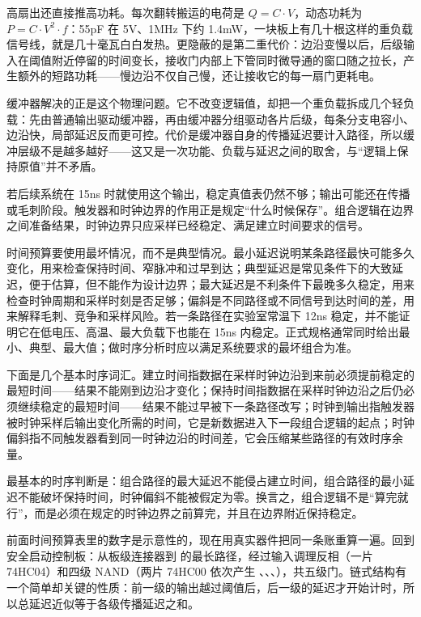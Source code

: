 高扇出还直接推高功耗。每次翻转搬运的电荷是 $Q=C\cdot V$，动态功耗为 $P=C\cdot V^{2}\cdot f$：55pF 在 5V、1MHz 下约 1.4mW，一块板上有几十根这样的重负载信号线，就是几十毫瓦白白发热。更隐蔽的是第二重代价：边沿变慢以后，后级输入在阈值附近停留的时间变长，接收门内部上下管同时微导通的窗口随之拉长，产生额外的短路功耗——慢边沿不仅自己慢，还让接收它的每一扇门更耗电。

缓冲器解决的正是这个物理问题。它不改变逻辑值，却把一个重负载拆成几个轻负载：先由普通输出驱动缓冲器，再由缓冲器分组驱动各片后级，每条分支电容小、边沿快，局部延迟反而更可控。代价是缓冲器自身的传播延迟要计入路径，所以缓冲层级不是越多越好——这又是一次功能、负载与延迟之间的取舍，与“逻辑上保持原值”并不矛盾。

若后续系统在 15ns 时就使用这个输出，稳定真值表仍然不够；输出可能还在传播或毛刺阶段。触发器和时钟边界的作用正是规定“什么时候保存”。组合逻辑在边界之间准备结果，时钟边界只应采样已经稳定、满足建立时间要求的信号。

时间预算要使用最坏情况，而不是典型情况。最小延迟说明某条路径最快可能多久变化，用来检查保持时间、窄脉冲和过早到达；典型延迟是常见条件下的大致延迟，便于估算，但不能作为设计边界；最大延迟是不利条件下最晚多久稳定，用来检查时钟周期和采样时刻是否足够；偏斜是不同路径或不同信号到达时间的差，用来解释毛刺、竞争和采样风险。若一条路径在实验室常温下 12ns 稳定，并不能证明它在低电压、高温、最大负载下也能在 15ns 内稳定。正式规格通常同时给出最小、典型、最大值；做时序分析时应以满足系统要求的最坏组合为准。

下面是几个基本时序词汇。建立时间指数据在采样时钟边沿到来前必须提前稳定的最短时间——结果不能刚到边沿才变化；保持时间指数据在采样时钟边沿之后仍必须继续稳定的最短时间——结果不能过早被下一条路径改写；时钟到输出指触发器被时钟采样后输出变化所需的时间，它是新数据进入下一段组合逻辑的起点；时钟偏斜指不同触发器看到同一时钟边沿的时间差，它会压缩某些路径的有效时序余量。

最基本的时序判断是：组合路径的最大延迟不能侵占建立时间，组合路径的最小延迟不能破坏保持时间，时钟偏斜不能被假定为零。换言之，组合逻辑不是“算完就行”，而是必须在规定的时钟边界之前算完，并且在边界附近保持稳定。

前面时间预算表里的数字是示意性的，现在用真实器件把同一条账重算一遍。回到安全启动控制板：从板级连接器到  的最长路径，经过输入调理反相（一片 74HC04）和四级 NAND（两片 74HC00 依次产生 、、、），共五级门。链式结构有一个简单却关键的性质：前一级的输出越过阈值后，后一级的延迟才开始计时，所以总延迟近似等于各级传播延迟之和。

